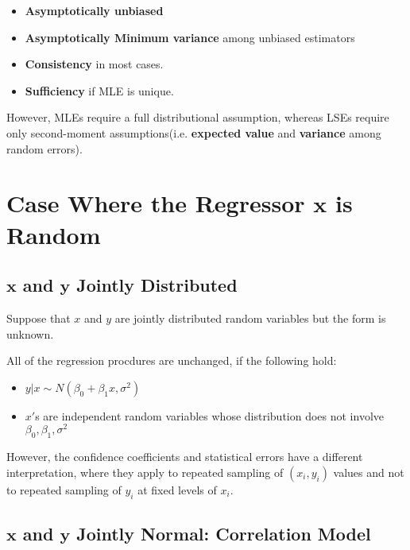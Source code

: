 \documentclass[12pt]{article}
\begin{document}
\begin{itemize}
	\item \textbf{Asymptotically unbiased}
	\item \textbf{Asymptotically Minimum variance} among unbiased estimators
	\item \textbf{Consistency} in most cases.
	\item \textbf{Sufficiency} if MLE is unique.
\end{itemize}

However, MLEs require a full distributional assumption, whereas LSEs require only second-moment assumptions(i.e. \textbf{expected value} and \textbf{variance} among random errors). 



\section{Case Where the Regressor $\mathbf{x}$ is Random}


\subsection{$\mathbf{x}$ and $\mathbf{y}$ Jointly Distributed}

Suppose that $x$ and $y$ are jointly distributed random variables but the form is unknown. 

All of the regression procdures are unchanged, if the following hold:

\begin{itemize}
	\item $y | x \sim N(\beta_0 + \beta_1 x, \sigma^2)$
	\item $x'$s are independent random variables whose distribution does not involve $\beta_0, \beta_1, \sigma^2$
\end{itemize}

However, the confidence coefficients and statistical errors have a different interpretation, where they apply to repeated sampling of $(x_i, y_i)$ values and not to repeated sampling of $y_i$ at fixed levels of $x_i$. 


\subsection{$\mathbf{x}$ and $\mathbf{y}$ Jointly Normal: Correlation Model}
\end{document}
